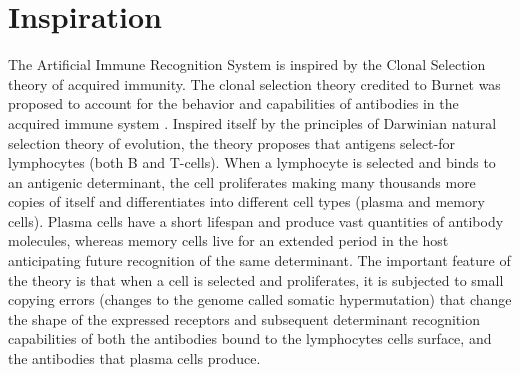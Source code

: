 \documentclass[a4paper, 11pt]{article}
\begin{document}
\section{Inspiration}
\label{sec:inspiration}
The Artificial Immune Recognition System is inspired by the Clonal Selection theory of acquired immunity.
The clonal selection theory credited to Burnet was proposed to account for the behavior and capabilities of antibodies in the acquired immune system \cite{Burnet1957, Burnet1959}. Inspired itself by the principles of Darwinian natural selection theory of evolution, the theory proposes that antigens select-for lymphocytes (both B and T-cells). When a lymphocyte is selected and binds to an antigenic determinant, the cell proliferates making many thousands more copies of itself and differentiates into different cell types (plasma and memory cells). Plasma cells have a short lifespan and produce vast quantities of antibody molecules, whereas memory cells live for an extended period in the host anticipating future recognition of the same determinant. The important feature of the theory is that when a cell is selected and proliferates, it is subjected to small copying errors (changes to the genome called somatic hypermutation) that change the shape of the expressed receptors and subsequent determinant recognition capabilities of both the antibodies bound to the lymphocytes cells surface, and the antibodies that plasma cells produce.

\end{document}
